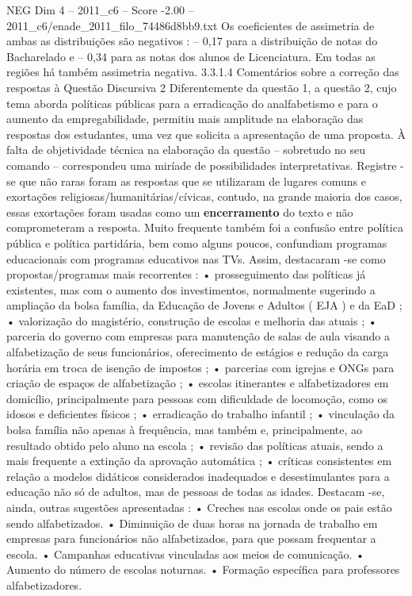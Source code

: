 \begin{textsample}{NEG Dim 4 – 2011\_c6 – Score -2.00 – 2011\_c6/enade\_2011\_filo\_74486d8bb9.txt}
Os coeficientes de assimetria de ambas as distribuições são negativos : – 0,17 para a distribuição de notas do Bacharelado e – 0,34 para as notas dos alunos de Licenciatura.
Em todas as regiões há também assimetria negativa. 3.3.1.4 Comentários sobre a correção das respostas à Questão Discursiva 2 Diferentemente da questão 1, a questão 2, cujo tema aborda políticas públicas para a erradicação do analfabetismo e para o aumento da empregabilidade, permitiu mais amplitude na elaboração das respostas dos estudantes, uma vez que solicita a apresentação de uma proposta.
À falta de objetividade técnica na elaboração da questão – sobretudo no seu comando – correspondeu uma miríade de possibilidades interpretativas.
Registre -se que não raras foram as respostas que se utilizaram de lugares comuns e exortações religiosas/humanitárias/cívicas, contudo, na grande maioria dos casos, essas exortações foram usadas como um \textbf{encerramento} do texto e não comprometeram a resposta.
Muito frequente também foi a confusão entre política pública e política partidária, bem como alguns poucos, confundiam programas educacionais com programas educativos nas TVs.
Assim, destacaram -se como propostas/programas mais recorrentes : • prosseguimento das políticas já existentes, mas com o aumento dos investimentos, normalmente sugerindo a ampliação da bolsa família, da Educação de Jovens e Adultos ( EJA ) e da EaD ; • valorização do magistério, construção de escolas e melhoria das atuais ; • parceria do governo com empresas para manutenção de salas de aula visando a alfabetização de seus funcionários, oferecimento de estágios e redução da carga horária em troca de isenção de impostos ; • parcerias com igrejas e ONGs para criação de espaços de alfabetização ; • escolas itinerantes e alfabetizadores em domicílio, principalmente para pessoas com dificuldade de locomoção, como os idosos e deficientes físicos ; • erradicação do trabalho infantil ; • vinculação da bolsa família não apenas à frequência, mas também e, principalmente, ao resultado obtido pelo aluno na escola ; • revisão das políticas atuais, sendo a mais frequente a extinção da aprovação automática ; • críticas consistentes em relação a modelos didáticos considerados inadequados e desestimulantes para a educação não só de adultos, mas de pessoas de todas as idades.
Destacam -se, ainda, outras sugestões apresentadas : • Creches nas escolas onde os pais estão sendo alfabetizados. • Diminuição de duas horas na jornada de trabalho em empresas para funcionários não alfabetizados, para que possam frequentar a escola. • Campanhas educativas vinculadas aos meios de comunicação. • Aumento do número de escolas noturnas. • Formação específica para professores alfabetizadores.

\end{textsample}
